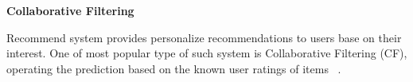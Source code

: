 \begin{flushleft}
	\textbf{Collaborative Filtering}
\end{flushleft}
Recommend system provides personalize recommendations to users base on their interest. One of most popular type of such system is Collaborative Filtering (CF), operating the prediction based on the known user ratings of items ~\parencite{zhang2014}.

